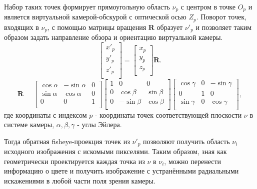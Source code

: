 Набор таких точек формирует прямоугольную область $\nu_p$ с центром в точке $O_p$ и является виртуальной камерой-обскурой        
с оптической осью $Z_p$. Поворот точек, входящих в $\nu_p$, с помощью матрицы вращения $\bm{R}$ образует $\nu'_p$ и
 позволяет таким образом задать направление обзора и ориентацию виртуальной камеры. 
\begin{equation}
    \label{eq:sweeped}
    \left[\begin{matrix}x'_p\\y'_p\\z'_p\\\end{matrix}\right] = \left[\begin{matrix}x_p\\y_p\\z_p\\\end{matrix}\right] \bm{R}.
\end{equation}  
\begin{equation}
    \label{eq:R}
    \bm{R} = \left[\begin{matrix}\cos{\alpha}&-\sin{\alpha}&0\\\sin{\alpha}&\cos{\alpha}&0\\0&0&1\\\end{matrix}\right]\left[\begin{matrix}1&0&0\\0&\cos{\beta}&\sin{\beta}\\0&-\sin{\beta}&\cos{\beta}\\\end{matrix}\right]\left[\begin{matrix}\cos{\gamma}&0&-\sin{\gamma}\\0&1&0\\\sin{\gamma}&0&\cos{\gamma}\\\end{matrix}\right],
\end{equation} 
где координаты с индексом $p$ -  координаты точек соответствующей плоскости $\nu$ в системе камеры, $\alpha, \beta, \gamma$ - углы Эйлера. %

Тогда обратная fisheye-проекция точек из $\nu'_p$ позволяют получить область $\nu_i$ исходного изображения с искомыми пикселями. 
Таким образом, зная как геометрически проектируется каждая точка из $\nu$ в $\nu_i$, можно перенести информацию о цвете и получить 
изображение с устранёнными радиальными искажениями в любой части поля зрения камеры. 

